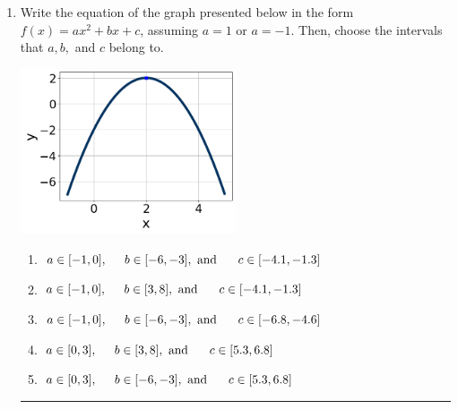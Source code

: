 \documentclass[14pt]{extbook}
\newcommand{\litem}[1]{\item#1\hspace*{-1cm}\rule{\textwidth}{0.4pt}}
\begin{document}
\begin{enumerate}
\litem{
Write the equation of the graph presented below in the form $f(x)=ax^2+bx+c$, assuming  $a=1$ or $a=-1$. Then, choose the intervals that $a, b,$ and $c$ belong to.
\begin{center}
    \includegraphics[width=0.5\textwidth]{../Figures/quadraticGraphToEquationC.png}
\end{center}
\begin{enumerate}[label=\Alph*.]
\item \( a \in [-1, 0], \hspace*{5mm} b \in [-6, -3], \text{ and } \hspace*{5mm} c \in [-4.1, -1.3] \)
\item \( a \in [-1, 0], \hspace*{5mm} b \in [3, 8], \text{ and } \hspace*{5mm} c \in [-4.1, -1.3] \)
\item \( a \in [-1, 0], \hspace*{5mm} b \in [-6, -3], \text{ and } \hspace*{5mm} c \in [-6.8, -4.6] \)
\item \( a \in [0, 3], \hspace*{5mm} b \in [3, 8], \text{ and } \hspace*{5mm} c \in [5.3, 6.8] \)
\item \( a \in [0, 3], \hspace*{5mm} b \in [-6, -3], \text{ and } \hspace*{5mm} c \in [5.3, 6.8] \)


\end{enumerate}}
\end{enumerate}
\end{document}
